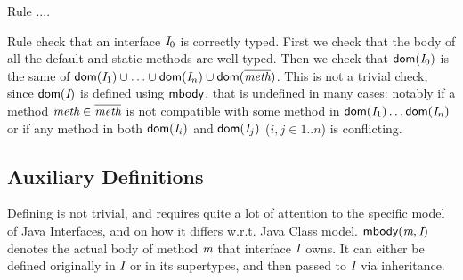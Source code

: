 Rule ....

Rule  check that an interface $\textit{I}_0$ is correctly typed.
First we check that the body of all the default and static methods are well typed.
Then we check that
$\textsf{dom}(\textit{I}_0)$ is the same of $\textsf{dom}(\textit{I}_1)\cup\ldots\cup\textsf{dom}(\textit{I}_n)\cup\textsf{dom}(\overline{\textit{meth}})$.
This is not a trivial check, since $\textsf{dom}(\textit{I})$ is defined using $\textsf{mbody}$, that is undefined in many cases: notably if a method $\textit{meth}\in\overline{\textit{meth}}$ is not compatible with some method in
$\textsf{dom}(\textit{I}_1)\ldots\textsf{dom}(\textit{I}_n)$ or if any method in both $\textsf{dom}(\textit{I}_i)$ and $\textsf{dom}(\textit{I}_j)$ ($i,j\in 1..n$)  is conflicting.





\subsection{Auxiliary Definitions}

\begin{comment}
\subsubsection{Auxiliary function: \textsf{mtype}}
- \textsf{mtype(m, C)} : the signature of method m in C.

\[ \inferrule{
  IT(T) = \text{\emph{ann} interface } C \{ \overline{M} \} \\
  E \spc m(\overline{D} \spc \overline{x}) \{ \text{return } e; \} \in M}
{ \textsf{mtype(m,T)} = \overline{D} \to E } \]

\[ \inferrule{
  IT(T) = \text{\emph{ann} interface } C \{ \overline{M} \} \\
  m \notin M}
{ \textsf{mtype(m,T)} = \emptyset } \]

\[ \inferrule{
  IT(T) = \text{\emph{ann} interface } C \text{ extends } C_1,...,C_k \{ \overline{M} \} \\
  E \spc m(\overline{D} \spc \overline{x}) \{ \text{return } e; \} \in M}
{ \textsf{mtype(m,T)} = \overline{D} \to E } \]

\[ \inferrule{
  IT(T) = \text{\emph{ann} interface } C_0 \text{ extends } \overline{C} \{
  \overline{M} \} \\
  m \notin M}
{ \textsf{mtype(m,T)} = \bigcup \textsf{mtype}(m,\overline{D}) } \]
\end{comment}


Defining \mBody{} is not trivial, and requires quite a lot of attention to the specific model of Java Interfaces, and on how it differs w.r.t. Java Class model.
$\textsf{mbody}(\textit{m},\textit{I})$ denotes the actual body of method $\textit{m}$ that interface $\textit{I}$ owns. It can either be defined originally in $\textit{I}$ or in its supertypes, and then passed to $\textit{I}$ via inheritance.

